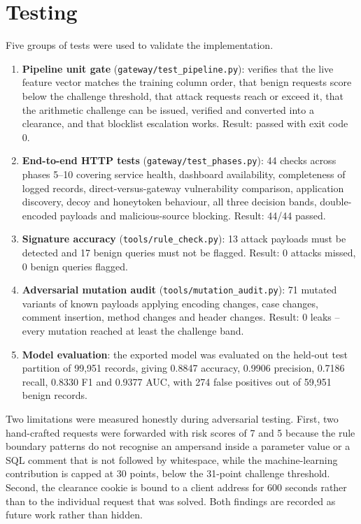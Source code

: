 \section{Testing}

Five groups of tests were used to validate the implementation.

\begin{enumerate}
	\item \textbf{Pipeline unit gate} (\texttt{gateway/test\_pipeline.py}): verifies that the live feature vector matches the training column order, that benign requests score below the challenge threshold, that attack requests reach or exceed it, that the arithmetic challenge can be issued, verified and converted into a clearance, and that blocklist escalation works. Result: passed with exit code 0.
	\item \textbf{End-to-end HTTP tests} (\texttt{gateway/test\_phases.py}): 44 checks across phases 5--10 covering service health, dashboard availability, completeness of logged records, direct-versus-gateway vulnerability comparison, application discovery, decoy and honeytoken behaviour, all three decision bands, double-encoded payloads and malicious-source blocking. Result: 44/44 passed.
	\item \textbf{Signature accuracy} (\texttt{tools/rule\_check.py}): 13 attack payloads must be detected and 17 benign queries must not be flagged. Result: 0 attacks missed, 0 benign queries flagged.
	\item \textbf{Adversarial mutation audit} (\texttt{tools/mutation\_audit.py}): 71 mutated variants of known payloads applying encoding changes, case changes, comment insertion, method changes and header changes. Result: 0 leaks -- every mutation reached at least the challenge band.
	\item \textbf{Model evaluation}: the exported model was evaluated on the held-out test partition of 99,951 records, giving 0.8847 accuracy, 0.9906 precision, 0.7186 recall, 0.8330 F1 and 0.9377 AUC, with 274 false positives out of 59,951 benign records.
\end{enumerate}

Two limitations were measured honestly during adversarial testing. First, two hand-crafted requests were forwarded with risk scores of 7 and 5 because the rule boundary patterns do not recognise an ampersand inside a parameter value or a SQL comment that is not followed by whitespace, while the machine-learning contribution is capped at 30 points, below the 31-point challenge threshold. Second, the clearance cookie is bound to a client address for 600 seconds rather than to the individual request that was solved. Both findings are recorded as future work rather than hidden.
